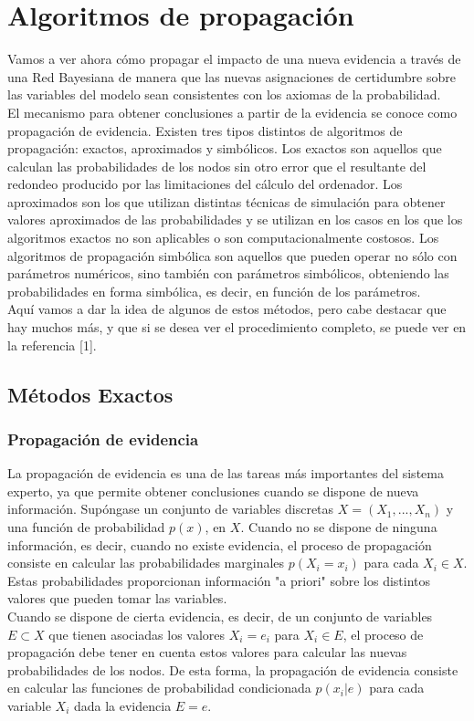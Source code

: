 \documentclass{article}
\begin{document}
\section{Algoritmos de propagación}
Vamos a ver ahora cómo propagar el impacto de una nueva evidencia a través de una Red Bayesiana de manera que las nuevas asignaciones de certidumbre sobre las variables del modelo sean consistentes con los axiomas de la probabilidad.\\
El mecanismo para obtener conclusiones a partir de la evidencia se conoce como propagación de evidencia. Existen tres tipos distintos de algoritmos de propagación: exactos, aproximados y simbólicos. Los exactos son aquellos que calculan las probabilidades de los nodos sin otro error que el resultante del redondeo producido por las limitaciones del cálculo del ordenador. Los aproximados son los que utilizan distintas técnicas de simulación para obtener valores aproximados de las probabilidades y se utilizan en los casos en los que los algoritmos exactos no son aplicables o son computacionalmente costosos. Los algoritmos de propagación simbólica son aquellos que pueden operar no sólo con parámetros numéricos, sino también con parámetros simbólicos, obteniendo las probabilidades en forma simbólica, es decir, en función de los parámetros.\\

Aquí vamos a dar la idea de algunos de estos métodos, pero cabe destacar que hay muchos más, y que si se desea ver el procedimiento completo, se puede ver en la referencia [1].

\subsection{Métodos Exactos}

\subsubsection{Propagación de evidencia}
La propagación de evidencia es una de las tareas más importantes del sistema experto, ya que permite obtener conclusiones cuando se dispone de nueva información. Supóngase un conjunto de variables discretas $X=(X_1,...,X_n)$ y una función de probabilidad $p(x)$, en $X$. Cuando no se dispone de ninguna información, es decir, cuando no existe evidencia, el proceso de propagación consiste en calcular las probabilidades marginales $p(X_i=x_i)$ para cada $X_i \in X$. Estas probabilidades proporcionan información "a priori" sobre los distintos valores que pueden tomar las variables.\\
Cuando se dispone de cierta evidencia, es decir, de un conjunto de variables $E \subset X$ que tienen asociadas los valores $X_i = e_i$ para $X_i \in E$, el proceso de propagación debe tener en cuenta estos valores para calcular las nuevas probabilidades de los nodos. De esta forma, la propagación de evidencia consiste en calcular las funciones de probabilidad condicionada $p(x_i|e)$ para cada variable $X_i$ dada la evidencia $E=e$.\\
\end{document}
